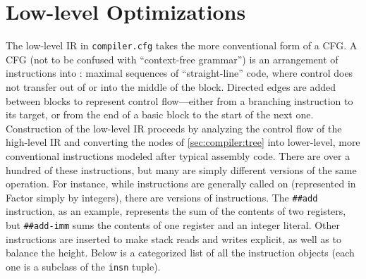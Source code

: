 \section{Low-level Optimizations}\label{sec:compiler:cfg}

The low-level \gls{IR} in \Verb|compiler.cfg| takes the more conventional
form of a \gls{CFG}.  A \gls{CFG} (not to be confused with ``context-free
grammar'') is an arrangement of instructions into : maximal
sequences of ``straight-line'' code, where control does not transfer out of or
into the middle of the block.  Directed edges are added between blocks to
represent control flow---either from a branching instruction to its target, or
from the end of a basic block to the start of the next one.
Construction of the low-level \gls{IR} proceeds by analyzing the control flow
of the high-level \gls{IR} and converting the nodes of \cref{sec:compiler:tree}
into lower-level, more conventional instructions modeled after typical assembly
code.  There are over a hundred of these instructions, but many are simply
different versions of the same operation.  For instance, while instructions are
generally called on  (represented in Factor simply by
integers), there are  versions of instructions.  The
\Verb|##add| instruction, as an example, represents the sum of the contents
of two registers, but \Verb|##add-imm| sums the contents of one register and
an integer literal.  Other instructions are inserted to make stack reads and
writes explicit, as well as to balance the height.  Below is a categorized list
of all the instruction objects (each one is a subclass of the \Verb|insn|
tuple).





